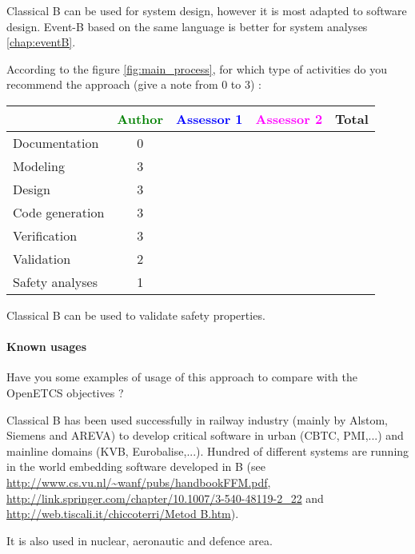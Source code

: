 \begin{author_comment}
Classical B can be used for system design, however it is most adapted to software design. Event-B  based on the same language is better for system analyses \ref{chap:eventB}.
\end{author_comment}

According to the figure \ref{fig:main_process}, for which type of activities do you recommend the approach (give a note from 0 to  3) :

\begin{tabular}{|l | c | c | c | c|}
\hline
& \textcolor{green}{Author} & \textcolor{blue}{Assessor 1} & \textcolor{magenta}{Assessor 2} & Total \\
\hline 
Documentation & 0 & & &  \\
\hline
Modeling & 3 & & &  \\
\hline
Design & 3 & & & \\
\hline
Code generation & 3 & & & \\
\hline
Verification & 3 & & & \\
\hline
Validation & 2 & & & \\
\hline
Safety analyses & 1 & & & \\
\hline
\end{tabular}


\begin{author_comment}
Classical B  can be used to  validate safety properties.
\end{author_comment}

\paragraph{Known usages} Have you some examples of usage of this approach to  compare with the OpenETCS objectives ?

\begin{author_comment}

Classical B has been used successfully  in railway  industry (mainly by Alstom, Siemens and AREVA) to  develop critical software in urban (CBTC, PMI,...) and mainline domains (KVB, Eurobalise,...). Hundred of different systems are running in the world embedding software developed in B (see \url{http://www.cs.vu.nl/~wanf/pubs/handbookFFM.pdf}, \url{http://link.springer.com/chapter/10.1007/3-540-48119-2_22} and \url{http://web.tiscali.it/chiccoterri/Metod B.htm}).

It is also used in nuclear, aeronautic and defence area.

\end{author_comment}


